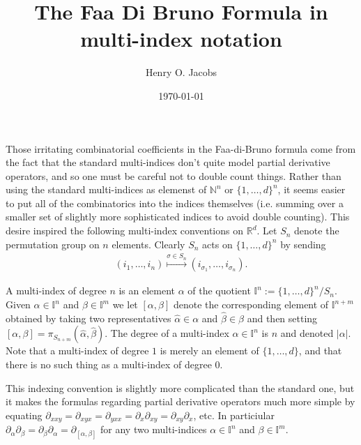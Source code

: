 \documentclass[12pt]{amsart}
\title{The Faa Di Bruno Formula in multi-index notation}
\author{Henry O. Jacobs}
\date{\today}
\newcommand{\R}{\ensuremath{\mathbb{R}}}
\begin{document}
\maketitle

Those irritating combinatorial coefficients in the Faa-di-Bruno formula
come from the fact that the standard multi-indices don't quite model
partial derivative operators, and so one must be careful not to double 
count things.
Rather than using the standard multi-indices as elemenst of $\mathbb{N}^n$ or
$\{1,\dots,d\}^n$,
it seems easier to put all of the combinatorics into the indices themselves (i.e. summing over a smaller set of slightly more sophisticated indices to avoid double counting).
This desire inspired the following multi-index conventions on $\R^d$.  Let $S_n$
  denote the permutation group on $n$ elements.
  Clearly $S_n$ acts on $\{ 1,\dots, d\}^n$ by sending
  \begin{align*}
    (i_1,\dots,i_n) \stackrel{\sigma \in S_n}{\mapsto} ( i_{\sigma_1} ,\dots,i_{\sigma_n}).
  \end{align*}

  A multi-index of degree $n$ is an element $\alpha$ of the quotient $\mathbb{I}^n := \{1,\dots,d\}^n / S_n$.
Given $\alpha \in \mathbb{I}^n$ and $\beta \in \mathbb{I}^m$ we let $[\alpha,\beta]$ denote the corresponding element of $\mathbb{I}^{n +m}$
obtained by taking two representatives $\hat{\alpha} \in \alpha$ and $\hat{\beta} \in \beta$ and then setting $[\alpha,\beta] = \pi_{S_{n+m}}(\hat{\alpha},\hat{\beta})$.
The degree of a multi-index $\alpha \in \mathbb{I}^n$ is $n$ and denoted $|\alpha|$.  Note that a multi-index of degree $1$ is merely an element of $\{1,\dots,d\}$, and that there is no such thing as a multi-index of degree $0$.

This indexing convention is slightly more complicated than the standard
one, but it makes the formulas regarding partial derivative operators much more simple by equating $\partial_{xxy}=\partial_{xyx}=\partial_{yxx} = \partial_x \partial_{xy} = \partial_{xy} \partial_x$, etc.  In particiular $\partial_{\alpha} \partial_{\beta} = \partial_{\beta} \partial_{\alpha} = \partial_{[\alpha,\beta]}$ for any two multi-indices $\alpha \in \mathbb{I}^n$ and $\beta \in \mathbb{I}^m$.
\end{document}
